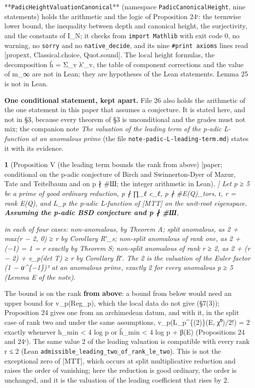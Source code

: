 \documentclass[11pt,a4paper]{article}
\theoremstyle{named}
\newtheorem*{namedthm}{}
\newcommand{\dispf}[1]{\par\smallskip{\centering #1\par}\smallskip}
\begin{document}
**\texttt{PadicHeightValuationCanonical}** (namespace \texttt{PadicCanonicalHeight}, nine statements) holds the arithmetic and the logic of Proposition 24ᶜ: the termwise lower bound, the inequality between depth and canonical height, the surjectivity, and the constants of I\_N; it checks from \texttt{import\ \allowbreak{}Mathlib} with exit code 0, no warning, no \texttt{sorry} and no \texttt{native\_\allowbreak{}decide}, and its nine \texttt{\#print\ \allowbreak{}axioms} lines read [propext, Classical.choice, Quot.sound]. The local height formulas, the decomposition ĥ = Σ\_v λ′\_v, the table of component corrections and the value of m\_∞ are not in Lean; they are hypotheses of the Lean statements. Lemma 25 is not in Lean.

\textbf{One conditional statement, kept apart.} File 26 also holds the arithmetic of the one statement in this paper that assumes a conjecture. It is stated here, and not in §3, because every theorem of §3 is unconditional and the grades must not mix; the companion note \textit{The valuation of the leading term of the p-adic L-function at an anomalous prime} (the file \texttt{note-padic-L-leading-term.\allowbreak{}md}) states it with its evidence.

\begin{namedthm}[Proposition V (the leading term bounds the rank from above) [paper; conditional on the p-adic conjecture of Birch and Swinnerton-Dyer of Mazur, Tate and Teitelbaum and on p ∤ \#Ш; the integer arithmetic in Lean]]
Let p ≥ 5 be a prime of good ordinary reduction, p ∤ ∏\_ℓ c\_ℓ, p ∤ \#E(Q)\_tors, ι, r = rank E(Q), and L\_p the p-adic L-function of [MTT] on the unit-root eigenspace. \textbf{Assuming the p-adic BSD conjecture and p ∤ \#Ш},
\dispf{\textbf{v\_p(L\_p\textasciicircum{}\{(r)\}(E, χ⁰)/r!) ≥ r}}
in each of four cases: non-anomalous, by Theorem A; split anomalous, as 2 + max(r − 2, 0) ≥ r by Corollary R′\_s; non-split anomalous of rank one, as 2 + (−1) = 1 = r exactly by Theorem S; non-split anomalous of rank r ≥ 2, as 2 + (r − 2) + v\_p(det T) ≥ r by Corollary R′. The 2 is the valuation of the Euler factor (1 − α\textasciicircum{}\{−1\})² at an anomalous prime, exactly 2 for every anomalous p ≥ 5 (Lemma E of the note).
\end{namedthm}

The bound is on the rank \textbf{from above}: a bound from below would need an upper bound for v\_p(Reg\_p), which the local data do not give (§7(3)); Proposition 24 gives one from an archimedean datum, and with it, in the split case of rank two and under the same assumptions, v\_p(L\_p\textasciicircum{}\{(2)\}(E, χ⁰)/2!) = 2 exactly whenever h\_min \textless{} 4 log p or ĥ\_min \textless{} 4 log p + β(E) (Propositions 24 and 24ᶜ). The same value 2 of the leading valuation is compatible with every rank r ≤ 2 (Lean \texttt{admissible\_\allowbreak{}leading\_\allowbreak{}two\_\allowbreak{}of\_\allowbreak{}rank\_\allowbreak{}le\_\allowbreak{}two}). This is not the exceptional zero of [MTT], which occurs at split multiplicative reduction and raises the order of vanishing; here the reduction is good ordinary, the order is unchanged, and it is the valuation of the leading coefficient that rises by 2.
\end{document}
